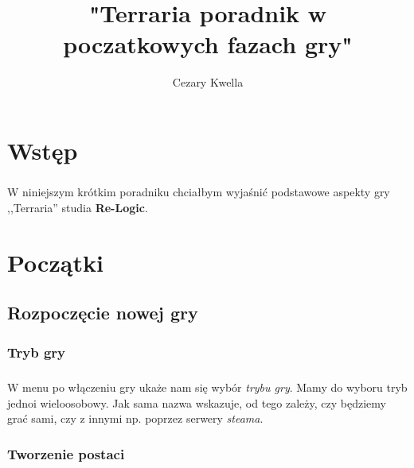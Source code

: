 \documentclass{report}
\title{"Terraria \ppauza poradnik w poczatkowych fazach gry"}
\author{Cezary Kwella}
\begin{document}
\maketitle
\tableofcontents
\listoftables
\chapter*{Wstęp}
\paragraph{} W niniejszym krótkim poradniku chciałbym wyjaśnić podstawowe aspekty gry ,,Terraria'' studia \textbf{Re-Logic}.
\chapter{Początki}
\section{Rozpoczęcie nowej gry}
\subsection{Tryb gry} 
\paragraph{} W menu po włączeniu gry ukaże nam się wybór \textit{trybu gry}. Mamy do wyboru tryb jedno\dywiz i wieloosobowy. Jak sama nazwa wskazuje, od tego zależy, czy będziemy grać sami, czy z innymi \ppauza np. poprzez serwery \textit{steama}.
\subsection{Tworzenie postaci}
\end{document}
